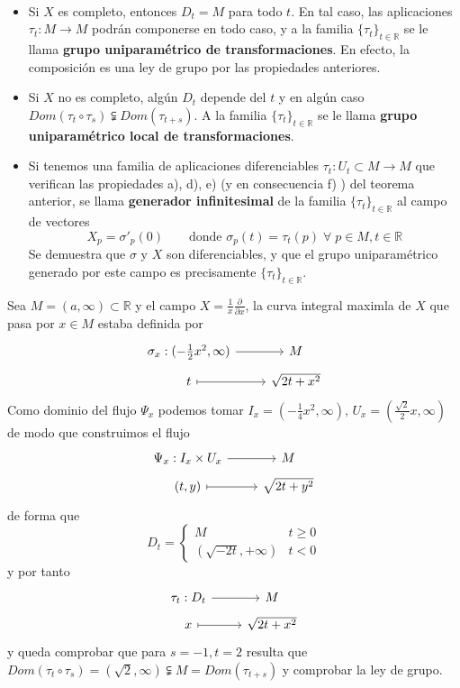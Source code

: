 \begin{obs} \,
\begin{itemize}
\item Si $X$ es completo, entonces $D_t = M$ para todo $t$. En tal caso, las aplicaciones $\tau_t:M\to M$ podrán componerse en todo caso, y a la familia $\{\tau_t\}_{t\in \mathbb{R}}$ se le llama \textbf{grupo uniparamétrico de transformaciones}. En efecto, la composición es una ley de grupo por las propiedades anteriores.
\item Si $X$ no es completo, algún $D_t$ depende del $t$ y en algún caso $Dom(\tau_t\circ \tau_s) \subsetneqq Dom(\tau_{t+s})$. A la familia $\{\tau_t\}_{t\in \mathbb{R}}$ se le llama \textbf{grupo uniparamétrico local de transformaciones}.
\item Si tenemos una familia de aplicaciones diferenciables $\tau_t:U_t \subset M \to M$ que verifican las propiedades a), d), e) (y en consecuencia f) ) del teorema anterior, se llama \textbf{generador infinitesimal} de la familia $\{\tau_t\}_{t \in \mathbb{R}}$ al campo de vectores
$$X_p = \sigma'_p(0) \qquad \text{donde } \sigma_p(t) = \tau_t(p) \;\forall\; p\in M, t\in \mathbb{R}$$
Se demuestra que $\sigma$ y $X$ son diferenciables, y que el grupo uniparamétrico generado por este campo es precisamente $\{\tau_t\}_{t \in \mathbb{R}}$.
\end{itemize}
\end{obs}
\begin{ejem}
    Sea $M=(a,\infty)\subset \mathbb R$ y el campo $X=\frac{1}{x} \frac{\partial}{\partial x}$, la curva integral maximla de $X$ que pasa por $x \in M$ estaba definida por
    $$\bt \sigma_x : (-\frac{1}{2}x^2, \infty) \arrow{r} & M \\[-5mm] t \arrow[mapsto]{r} & \sqrt{2t+x^2} \et$$
    Como dominio del flujo $\Psi_x$ podemos tomar $I_x=\left(-\frac{1}{4}x^2,\infty\right), \, U_x=\left(\frac{\sqrt{2}}{2}x,\infty\right)$ de modo que construimos el flujo
    $$\bt \Psi_x : I_x \times U_x \arrow{r} & M \\[-5mm] (t,y) \arrow[mapsto]{r} & \sqrt{2t+y^2} \et$$
    de forma que 
    $$D_t = \begin{cases}
        M & t \geq 0 \\ (\sqrt{-2t},+\infty) & t < 0
    \end{cases}$$
    y por tanto 
    $$\bt \tau_t : D_t \arrow{r} & M \\[-5mm] x \arrow[mapsto]{r} & \sqrt{2t+x^2} \et$$
    y queda comprobar que para $s=-1, t=2$ resulta que $Dom (\tau_t\circ \tau_s)=(\sqrt{2}, \infty) \subsetneqq M = Dom(\tau_{t+s})$ y comprobar la ley de grupo. 
\end{ejem}



